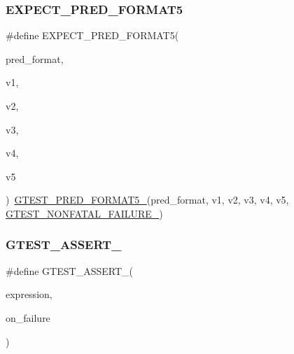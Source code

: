 \mbox{\label{googletest-master_2googletest_2include_2gtest_2gtest__pred__impl_8h_a74beddf9661e4460f9969fe211b9e80e}} 
\subsubsection{\texorpdfstring{EXPECT\_PRED\_FORMAT5}{EXPECT\_PRED\_FORMAT5}}
{\footnotesize\ttfamily \#define E\+X\+P\+E\+C\+T\+\_\+\+P\+R\+E\+D\+\_\+\+F\+O\+R\+M\+A\+T5(\begin{DoxyParamCaption}\item[{}]{pred\+\_\+format,  }\item[{}]{v1,  }\item[{}]{v2,  }\item[{}]{v3,  }\item[{}]{v4,  }\item[{}]{v5 }\end{DoxyParamCaption})~\mbox{\hyperlink{_obj__test_2lib_2googletest-release-1_88_81_2googletest_2include_2gtest_2gtest__pred__impl_8h_a107623ee191560f703a3fdc983803c8e}{G\+T\+E\+S\+T\+\_\+\+P\+R\+E\+D\+\_\+\+F\+O\+R\+M\+A\+T5\+\_\+}}(pred\+\_\+format, v1, v2, v3, v4, v5, \mbox{\hyperlink{_obj__test_2lib_2googletest-release-1_88_81_2googletest_2include_2gtest_2internal_2gtest-internal_8h_a6cb7482cfa03661a91c698eb5895f642}{G\+T\+E\+S\+T\+\_\+\+N\+O\+N\+F\+A\+T\+A\+L\+\_\+\+F\+A\+I\+L\+U\+R\+E\+\_\+}})}

\mbox{\label{googletest-master_2googletest_2include_2gtest_2gtest__pred__impl_8h_a8c09939dd67f1bb5b68c9f6a44ea75db}} 
\subsubsection{\texorpdfstring{GTEST\_ASSERT\_}{GTEST\_ASSERT\_}}
{\footnotesize\ttfamily \#define G\+T\+E\+S\+T\+\_\+\+A\+S\+S\+E\+R\+T\+\_\+(\begin{DoxyParamCaption}\item[{}]{expression,  }\item[{}]{on\+\_\+failure }\end{DoxyParamCaption})}


